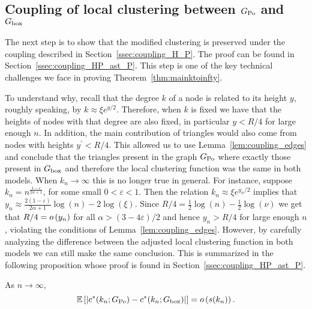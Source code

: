 \subsection{Coupling of local clustering between $G_{{\mathrm{Po}}}$ and $G_{\mathrm{box}}$}

The next step is to show that the modified clustering is preserved under the coupling described in Section~\ref{ssec:coupling_H_P}. The proof can be found in Section~\ref{ssec:coupling_HP_ast_P}. This step is one of the key technical challenges we face in proving Theorem~\ref{thm:mainktoinfty}. 

To understand why, recall that the degree $k$ of a node is related to its height $y$, roughly speaking, by $k \approx \xi e^{y/2}$. Therefore, when $k$ is fixed we have that the heights of nodes with that degree are also fixed, in particular $y < R/4$ for large enough $n$. In addition, the main contribution of triangles would also come from nodes with heights $y^\prime < R/4$. This allowed us to use Lemma~\ref{lem:coupling_edges} and conclude that the triangles present in the graph $G_{{\mathrm{Po}}}$ where exactly those present in $G_{\mathrm{box}}$ and therefore the local clustering function was the same in both models. When $k_n \to \infty$ this is no longer true in general. For instance, suppose $k_n = n^{\frac{1-\varepsilon}{2\alpha + 1}}$, for some small $0 < \varepsilon < 1$. Then the relation $k_n \approx \xi e^{y_n/2}$ implies that $y_n \approx \frac{2(1-\varepsilon)}{2\alpha + 1}\log(n) - 2\log(\xi)$. Since
$R/4 = \frac{1}{2}\log(n) - \frac{1}{2}\log(\nu)$ we get that $R/4 = o\left(y_n\right)$ for all $\alpha > (3 - 4\varepsilon)/2$ and hence $y_n > R/4$ for large enough $n$, violating the conditions of Lemma~\ref{lem:coupling_edges}. However, by carefully analyzing the difference between the adjusted local clustering function in both models we can still make the same conclusion. This is summarized in the following proposition whose proof is found in Section~\ref{ssec:coupling_HP_ast_P}.

\begin{proposition}\label{prop:couling_c_H_P}
As $n \to \infty$,
\[
	\mathbb{E}\left[\left|c^\ast(k_n; G_{{\mathrm{Po}}}) - c^\ast(k_n; G_{\mathrm{box}})\right|\right] = o\left(s(k_n)\right).
\]
\end{proposition}


